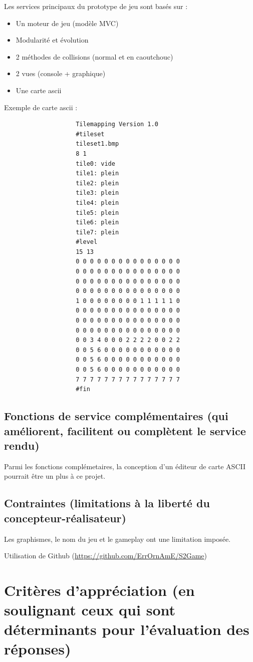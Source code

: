 \documentclass[11pt]{report}
\begin{document}
				Les services principaux du prototype de jeu sont basés sur :
				\begin{itemize}
			   		\item Un moteur de jeu (modèle MVC)
				    \item Modularité et évolution
				    \item 2 méthodes de collisions (normal et en caoutchouc)
				    \item 2 vues (console + graphique)
				    \item Une carte ascii
            	\end{itemize}
				Exemple de carte ascii :
				\begin{verbatim}
					Tilemapping Version 1.0
					#tileset
					tileset1.bmp
					8 1
					tile0: vide
					tile1: plein
					tile2: plein
					tile3: plein
					tile4: plein
					tile5: plein
					tile6: plein
					tile7: plein
					#level
					15 13
					0 0 0 0 0 0 0 0 0 0 0 0 0 0 0
					0 0 0 0 0 0 0 0 0 0 0 0 0 0 0
					0 0 0 0 0 0 0 0 0 0 0 0 0 0 0
					0 0 0 0 0 0 0 0 0 0 0 0 0 0 0
					1 0 0 0 0 0 0 0 0 1 1 1 1 1 0
					0 0 0 0 0 0 0 0 0 0 0 0 0 0 0
					0 0 0 0 0 0 0 0 0 0 0 0 0 0 0
					0 0 0 0 0 0 0 0 0 0 0 0 0 0 0
					0 0 3 4 0 0 0 2 2 2 2 0 0 2 2
					0 0 5 6 0 0 0 0 0 0 0 0 0 0 0
					0 0 5 6 0 0 0 0 0 0 0 0 0 0 0
					0 0 5 6 0 0 0 0 0 0 0 0 0 0 0
					7 7 7 7 7 7 7 7 7 7 7 7 7 7 7
					#fin
				\end{verbatim}
				
			\subsection{Fonctions de service complémentaires (qui améliorent, facilitent ou complètent le service rendu)}
			
				Parmi les fonctions complémetaires, la conception d’un éditeur de carte ASCII pourrait être un plus à ce projet.
			
			\subsection{Contraintes (limitations à la liberté du concepteur-réalisateur)}
			
				Les graphismes, le nom du jeu et le gameplay ont une limitation imposée.
				
				Utilisation de Github (\url{https://github.com/ErrOrnAmE/S2Game})
			
		\section{Critères d’appréciation (en soulignant ceux qui sont déterminants pour l’évaluation des réponses)}
		
\end{document}
